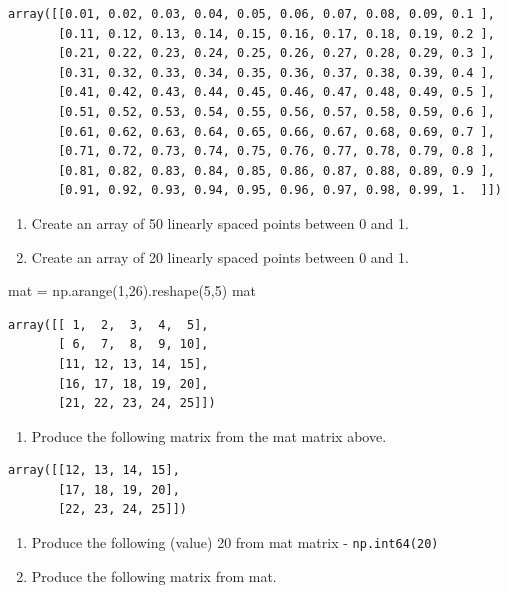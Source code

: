 \documentclass[
  letterpaper,
  DIV=11,
  numbers=noendperiod]{scrreprt}
\newenvironment{Shaded}{\begin{snugshade}}{\end{snugshade}}
\newcommand{\DecValTok}[1]{\textcolor[rgb]{0.68,0.00,0.00}{#1}}
\newcommand{\NormalTok}[1]{\textcolor[rgb]{0.00,0.23,0.31}{#1}}
\newcommand{\OperatorTok}[1]{\textcolor[rgb]{0.37,0.37,0.37}{#1}}
\providecommand{\tightlist}{%
  \setlength{\itemsep}{0pt}\setlength{\parskip}{0pt}}
\begin{document}
\begin{verbatim}
array([[0.01, 0.02, 0.03, 0.04, 0.05, 0.06, 0.07, 0.08, 0.09, 0.1 ],
       [0.11, 0.12, 0.13, 0.14, 0.15, 0.16, 0.17, 0.18, 0.19, 0.2 ],
       [0.21, 0.22, 0.23, 0.24, 0.25, 0.26, 0.27, 0.28, 0.29, 0.3 ],
       [0.31, 0.32, 0.33, 0.34, 0.35, 0.36, 0.37, 0.38, 0.39, 0.4 ],
       [0.41, 0.42, 0.43, 0.44, 0.45, 0.46, 0.47, 0.48, 0.49, 0.5 ],
       [0.51, 0.52, 0.53, 0.54, 0.55, 0.56, 0.57, 0.58, 0.59, 0.6 ],
       [0.61, 0.62, 0.63, 0.64, 0.65, 0.66, 0.67, 0.68, 0.69, 0.7 ],
       [0.71, 0.72, 0.73, 0.74, 0.75, 0.76, 0.77, 0.78, 0.79, 0.8 ],
       [0.81, 0.82, 0.83, 0.84, 0.85, 0.86, 0.87, 0.88, 0.89, 0.9 ],
       [0.91, 0.92, 0.93, 0.94, 0.95, 0.96, 0.97, 0.98, 0.99, 1.  ]])
\end{verbatim}

\begin{enumerate}
\def\labelenumi{\arabic{enumi}.}
\setcounter{enumi}{8}
\item
  Create an array of 50 linearly spaced points between 0 and 1.
\item
  Create an array of 20 linearly spaced points between 0 and 1.
\end{enumerate}

\begin{Shaded}
\begin{Highlighting}[]
\NormalTok{mat }\OperatorTok{=}\NormalTok{ np.arange(}\DecValTok{1}\NormalTok{,}\DecValTok{26}\NormalTok{).reshape(}\DecValTok{5}\NormalTok{,}\DecValTok{5}\NormalTok{)}
\NormalTok{mat}
\end{Highlighting}
\end{Shaded}

\begin{verbatim}
array([[ 1,  2,  3,  4,  5],
       [ 6,  7,  8,  9, 10],
       [11, 12, 13, 14, 15],
       [16, 17, 18, 19, 20],
       [21, 22, 23, 24, 25]])
\end{verbatim}

\begin{enumerate}
\def\labelenumi{\arabic{enumi}.}
\setcounter{enumi}{10}
\tightlist
\item
  Produce the following matrix from the mat matrix above.
\end{enumerate}

\begin{verbatim}
array([[12, 13, 14, 15],
       [17, 18, 19, 20],
       [22, 23, 24, 25]])
\end{verbatim}

\begin{enumerate}
\def\labelenumi{\arabic{enumi}.}
\setcounter{enumi}{11}
\item
  Produce the following (value) 20 from mat matrix -
  \texttt{np.int64(20)}
\item
  Produce the following matrix from mat.
\end{enumerate}
\end{document}
